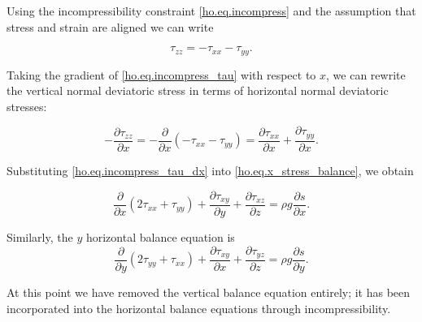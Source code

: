 \noindent
Using the incompressibility constraint \eqref{ho.eq.incompress} and the assumption that stress and strain are aligned we can write

\begin{equation}
  \label{ho.eq.incompress_tau}
  \tau _{zz} = -\tau _{xx}-\tau _{yy}.
\end{equation}

\noindent
Taking the gradient of \eqref{ho.eq.incompress_tau} with respect to $x$, we can rewrite the vertical normal deviatoric stress in terms of horizontal normal deviatoric stresses:

\begin{equation}
  \label{ho.eq.incompress_tau_dx}
  -\frac{\partial \tau _{zz}}{\partial x} = -\frac{\partial }{\partial x}\left( -\tau _{xx} - \tau _{yy} \right) = \frac{\partial \tau _{xx}}{\partial x} + \frac{\partial \tau _{yy}}{\partial x}.
\end{equation}
 
\noindent
Substituting \eqref{ho.eq.incompress_tau_dx} into \eqref{ho.eq.x_stress_balance}, we obtain
 
\begin{equation}
  \label{ho.eq.stress_balance_x}
  \frac{\partial }{\partial x} \left( 2 \tau_{xx} + \tau_{yy} \right) + \frac{\partial \tau _{xy}}{\partial y} + \frac{\partial \tau _{xz}}{\partial z} = \rho g\frac{\partial s}{\partial x}.
\end{equation}

\noindent
Similarly, the $y$ horizontal balance equation is
\begin{equation}
  \label{ho.eq.stress_balance_y}
  \frac{\partial }{\partial y} \left( 2 \tau_{yy} + \tau_{xx} \right) + \frac{\partial \tau _{xy}}{\partial x} + \frac{\partial \tau _{yz}}{\partial z} = \rho g\frac{\partial s}{\partial y}.
\end{equation}

\noindent 
At this point we have removed the vertical balance equation entirely; it has been incorporated into the horizontal balance equations through incompressibility.



